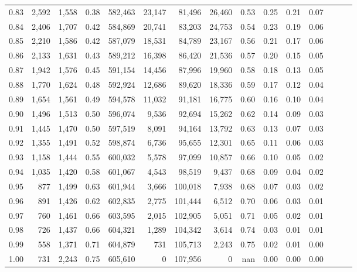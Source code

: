 \begin{tabular}{rrrrrrrrrrrrrrr}
0.83 &  2,592 &  1,558 &  0.38 &  582,463 &   23,147 &   81,496 &   26,460 &  0.53 &  0.25 &  0.21 &      0.07 \\
0.84 &  2,406 &  1,707 &  0.42 &  584,869 &   20,741 &   83,203 &   24,753 &  0.54 &  0.23 &  0.19 &      0.06 \\
0.85 &  2,210 &  1,586 &  0.42 &  587,079 &   18,531 &   84,789 &   23,167 &  0.56 &  0.21 &  0.17 &      0.06 \\
0.86 &  2,133 &  1,631 &  0.43 &  589,212 &   16,398 &   86,420 &   21,536 &  0.57 &  0.20 &  0.15 &      0.05 \\
0.87 &  1,942 &  1,576 &  0.45 &  591,154 &   14,456 &   87,996 &   19,960 &  0.58 &  0.18 &  0.13 &      0.05 \\
0.88 &  1,770 &  1,624 &  0.48 &  592,924 &   12,686 &   89,620 &   18,336 &  0.59 &  0.17 &  0.12 &      0.04 \\
0.89 &  1,654 &  1,561 &  0.49 &  594,578 &   11,032 &   91,181 &   16,775 &  0.60 &  0.16 &  0.10 &      0.04 \\
0.90 &  1,496 &  1,513 &  0.50 &  596,074 &    9,536 &   92,694 &   15,262 &  0.62 &  0.14 &  0.09 &      0.03 \\
0.91 &  1,445 &  1,470 &  0.50 &  597,519 &    8,091 &   94,164 &   13,792 &  0.63 &  0.13 &  0.07 &      0.03 \\
0.92 &  1,355 &  1,491 &  0.52 &  598,874 &    6,736 &   95,655 &   12,301 &  0.65 &  0.11 &  0.06 &      0.03 \\
0.93 &  1,158 &  1,444 &  0.55 &  600,032 &    5,578 &   97,099 &   10,857 &  0.66 &  0.10 &  0.05 &      0.02 \\
0.94 &  1,035 &  1,420 &  0.58 &  601,067 &    4,543 &   98,519 &    9,437 &  0.68 &  0.09 &  0.04 &      0.02 \\
0.95 &    877 &  1,499 &  0.63 &  601,944 &    3,666 &  100,018 &    7,938 &  0.68 &  0.07 &  0.03 &      0.02 \\
0.96 &    891 &  1,426 &  0.62 &  602,835 &    2,775 &  101,444 &    6,512 &  0.70 &  0.06 &  0.03 &      0.01 \\
0.97 &    760 &  1,461 &  0.66 &  603,595 &    2,015 &  102,905 &    5,051 &  0.71 &  0.05 &  0.02 &      0.01 \\
0.98 &    726 &  1,437 &  0.66 &  604,321 &    1,289 &  104,342 &    3,614 &  0.74 &  0.03 &  0.01 &      0.01 \\
0.99 &    558 &  1,371 &  0.71 &  604,879 &      731 &  105,713 &    2,243 &  0.75 &  0.02 &  0.01 &      0.00 \\
1.00 &    731 &  2,243 &  0.75 &  605,610 &        0 &  107,956 &        0 &   nan &  0.00 &  0.00 &      0.00 \\
\bottomrule
\end{tabular}
